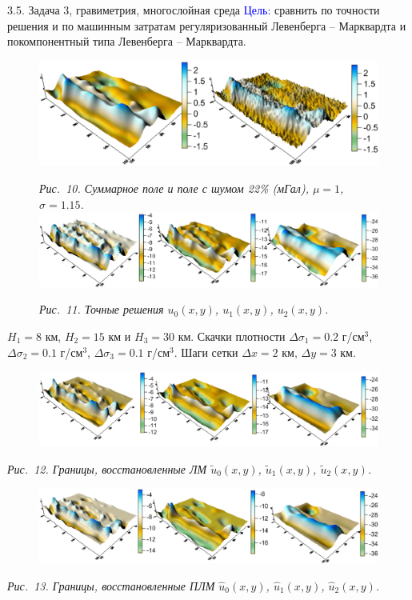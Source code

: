 \documentclass[10pt,pdf, mathserif, hyperref={unicode}]{beamer}
\begin{document}
\begin{frame}{\small 3.5. Задача 3, гравиметрия, многослойная среда}
	\textcolor{blue}{Цель:} сравнить по точности решения и по машинным затратам регуляризованный Левенберга -- Марквардта и покомпонентный типа Левенберга -- Марквардта.
	\begin{figure}
		\centering
		\includegraphics[height=0.2\textheight]{fields}
		
		\centering\textit{Рис.~10. Суммарное поле и поле с шумом 22\% (мГал), $\mu=1$, $\sigma=1.15$.}
		\centering
		\includegraphics[height=0.2\textheight]{exact_hor}
		
		\centering\textit{Рис.~11. Точные решения $u_0(x,y)$, $u_1(x,y)$, $u_2(x,y)$.}
	\end{figure}
	
	$H_1=8$ км, $H_2=15$ км и $H_3=30$ км. Скачки плотности $\Delta\sigma_1=0.2$ г/см$^3$, $\Delta\sigma_2=0.1$ г/см$^3$, $\Delta\sigma_3=0.1$ г/см$^3$. Шаги сетки $\Delta x=2$ км, $\Delta y=3$ км.
\end{frame}
\begin{frame}
	\begin{figure}
		\centering
		\includegraphics[height=0.2\textheight]{levmar}
	\end{figure}
	\centering\textit{Рис.~12. Границы, восстановленные ЛМ $\tilde{u}_0(x,y)$, $\tilde{u}_1(x,y)$, $\tilde{u}_2(x,y)$.}
	\begin{figure}
		\centering
		\includegraphics[height=0.2\textheight]{clm}
	\end{figure}
	\centering\textit{Рис.~13. Границы, восстановленные ПЛМ $\hat{u}_0(x,y)$, $\hat{u}_1(x,y)$, $\hat{u}_2(x,y)$.}
\end{frame}
\end{document}
